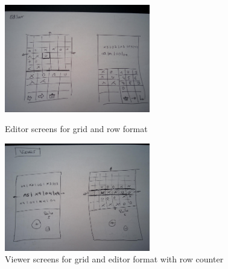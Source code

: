 \begin{figure}
\centering
\begin{minipage}{.5\textwidth}
  \centering
  \includegraphics[width=2.5in]{images/image00.jpg}
  \caption{Editor screens for grid and row format}
  \label{fig_wireframe3}
\end{minipage}

\begin{minipage}{.5\textwidth}
  \centering
  \includegraphics[width=2.5in]{images/image02.jpg}
  \caption{Viewer screens for grid and editor format with row counter}
  \label{fig_wireframe4}
\end{minipage}
\end{figure}